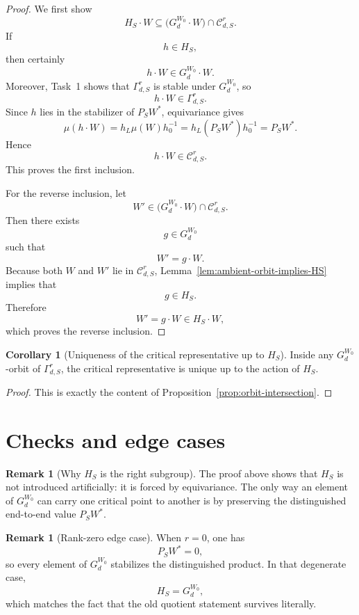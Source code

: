 \documentclass{article}
\theoremstyle{definition}
\newtheorem{corollary}[theorem]{Corollary}
\newtheorem{remark}[theorem]{Remark}
\begin{document}
\begin{proof}
We first show
\[
H_S\cdot W\subseteq \bigl(G_d^{W_0}\cdot W\bigr)\cap \mathcal C_{d,S}^r.
\]
If
\[
h\in H_S,
\]
then certainly
\[
h\cdot W\in G_d^{W_0}\cdot W.
\]
Moreover, Task~1 shows that $\Gamma_{d,S}^r$ is stable under $G_d^{W_0}$, so
\[
h\cdot W\in \Gamma_{d,S}^r.
\]
Since $h$ lies in the stabilizer of $P_SW^\ast$, equivariance gives
\[
\mu(h\cdot W)=h_L\mu(W)h_0^{-1}=h_L(P_SW^\ast)h_0^{-1}=P_SW^\ast.
\]
Hence
\[
h\cdot W\in \mathcal C_{d,S}^r.
\]
This proves the first inclusion.

For the reverse inclusion, let
\[
W'\in \bigl(G_d^{W_0}\cdot W\bigr)\cap \mathcal C_{d,S}^r.
\]
Then there exists
\[
g\in G_d^{W_0}
\]
such that
\[
W'=g\cdot W.
\]
Because both $W$ and $W'$ lie in $\mathcal C_{d,S}^r$, Lemma~\ref{lem:ambient-orbit-implies-HS}
implies that
\[
g\in H_S.
\]
Therefore
\[
W'=g\cdot W\in H_S\cdot W,
\]
which proves the reverse inclusion.
\end{proof}

\begin{corollary}[Uniqueness of the critical representative up to $H_S$]\label{cor:uniqueness}
Inside any $G_d^{W_0}$-orbit of $\Gamma_{d,S}^r$, the critical representative is
unique up to the action of $H_S$.
\end{corollary}

\begin{proof}
This is exactly the content of Proposition~\ref{prop:orbit-intersection}.
\end{proof}

\section{Checks and edge cases}

\begin{remark}[Why $H_S$ is the right subgroup]
The proof above shows that $H_S$ is not introduced artificially: it is forced by
equivariance. The only way an element of $G_d^{W_0}$ can carry one critical
point to another is by preserving the distinguished end-to-end value
$P_SW^\ast$.
\end{remark}

\begin{remark}[Rank-zero edge case]
When $r=0$, one has
\[
P_SW^\ast=0,
\]
so every element of $G_d^{W_0}$ stabilizes the distinguished product. In that
degenerate case,
\[
H_S=G_d^{W_0},
\]
which matches the fact that the old quotient statement survives literally.
\end{remark}
\end{document}
